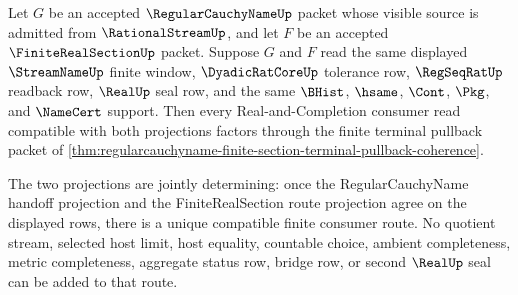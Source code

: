 \begin{theorem}
\label{thm:regularcauchyname-terminal-pullback-exactness}
Let $G$ be an accepted $\RegularCauchyNameUp$ packet whose visible source is admitted from $\RationalStreamUp$, and let $F$ be an accepted $\FiniteRealSectionUp$ packet. Suppose $G$ and $F$ read the same displayed $\StreamNameUp$ finite window, $\DyadicRatCoreUp$ tolerance row, $\RegSeqRatUp$ readback row, $\RealUp$ seal row, and the same $\BHist$, $\hsame$, $\Cont$, $\Pkg$, and $\NameCert$ support. Then every Real-and-Completion consumer read compatible with both projections factors through the finite terminal pullback packet of \autoref{thm:regularcauchyname-finite-section-terminal-pullback-coherence}.

The two projections are jointly determining: once the RegularCauchyName handoff projection and the FiniteRealSection route projection agree on the displayed rows, there is a unique compatible finite consumer route. No quotient stream, selected host limit, host equality, countable choice, ambient completeness, metric completeness, aggregate status row, bridge row, or second $\RealUp$ seal can be added to that route.
\end{theorem}
